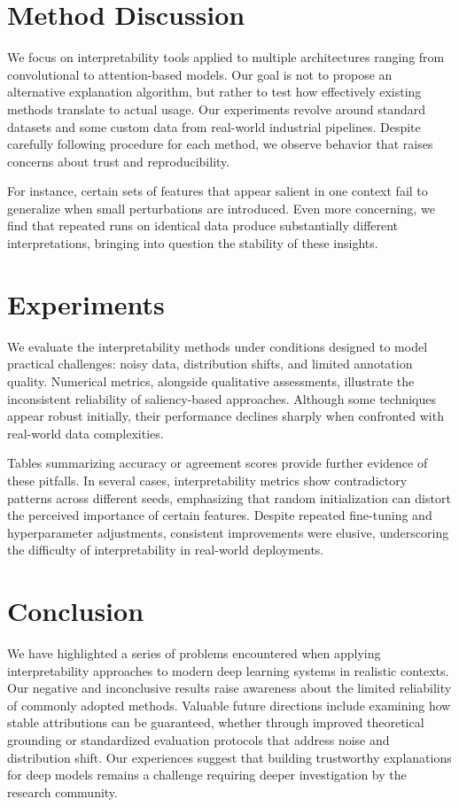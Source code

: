 \documentclass{article}
\begin{document}
\section{Method Discussion}
We focus on interpretability tools applied to multiple architectures ranging from convolutional to attention-based models. Our goal is not to propose an alternative explanation algorithm, but rather to test how effectively existing methods translate to actual usage. Our experiments revolve around standard datasets and some custom data from real-world industrial pipelines. Despite carefully following procedure for each method, we observe behavior that raises concerns about trust and reproducibility.

For instance, certain sets of features that appear salient in one context fail to generalize when small perturbations are introduced. Even more concerning, we find that repeated runs on identical data produce substantially different interpretations, bringing into question the stability of these insights.

\section{Experiments}
We evaluate the interpretability methods under conditions designed to model practical challenges: noisy data, distribution shifts, and limited annotation quality. Numerical metrics, alongside qualitative assessments, illustrate the inconsistent reliability of saliency-based approaches. Although some techniques appear robust initially, their performance declines sharply when confronted with real-world data complexities.

Tables summarizing accuracy or agreement scores provide further evidence of these pitfalls. In several cases, interpretability metrics show contradictory patterns across different seeds, emphasizing that random initialization can distort the perceived importance of certain features. Despite repeated fine-tuning and hyperparameter adjustments, consistent improvements were elusive, underscoring the difficulty of interpretability in real-world deployments.

\section{Conclusion}
We have highlighted a series of problems encountered when applying interpretability approaches to modern deep learning systems in realistic contexts. Our negative and inconclusive results raise awareness about the limited reliability of commonly adopted methods. Valuable future directions include examining how stable attributions can be guaranteed, whether through improved theoretical grounding or standardized evaluation protocols that address noise and distribution shift. Our experiences suggest that building trustworthy explanations for deep models remains a challenge requiring deeper investigation by the research community.
\end{document}

